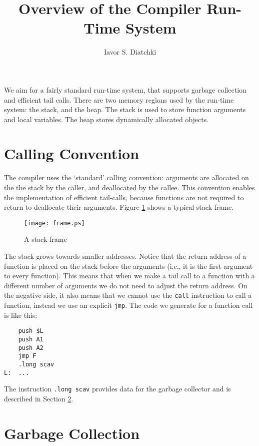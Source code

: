 \documentclass{article}
\title{Overview of the Compiler Run-Time System}
\author{Iavor S. Diatchki}
\begin{document}
We aim for a fairly standard run-time system, that supports garbage
collection and efficient tail calls.  There are two memory regions used
by the run-time system: the stack, and the heap.  The stack is used
to store function arguments and local variables.  The heap stores
dynamically allocated objects.

\section{Calling Convention}
\label{call-sec}

The compiler uses the `standard' calling convention: arguments are 
allocated on the the stack by the caller, and deallocated by the callee.
This convention enables the implementation of efficient tail-calls,
because functions are not required to return to deallocate their arguments.
Figure \ref{frame-fig} shows a typical stack frame.
\begin{figure}[!ht]
\texttt{[image: frame.ps]}
\caption{A stack frame}
\label{frame-fig}
\end{figure}
The stack grows towards smaller addresses.  Notice that the return address
of a function is placed on the stack before the arguments (i.e., it is the
first argument to every function).  This means that when we make a tail call
to a function with a different number of arguments we do not need to adjust
the return address.  On the negative side, it also means that we cannot
use the {\tt call} instruction to call a function, instead we use an 
explicit {\tt jmp}.  The code we generate for a function call is like this:
\begin{verbatim}
    push $L
    push A1
    push A2
    jmp F
    .long scav
L:  ... 
\end{verbatim}
The instruction \verb|.long scav| provides data for the garbage collector
and is described in Section \ref{gc-sec}.




\section{Garbage Collection}
\label{gc-sec}
\end{document}
